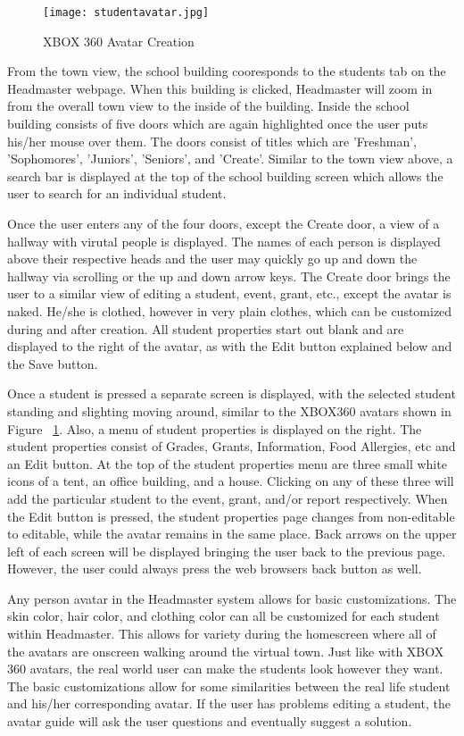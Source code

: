 \documentclass[11pt]{article}
\begin{document}
\begin{figure}
\centering
\texttt{[image: studentavatar.jpg]}
\caption{XBOX 360 Avatar Creation}
\label{avatar}
\end{figure}

From the town view, the school building cooresponds to the students tab on the Headmaster webpage. When this building is clicked, Headmaster will zoom in from the overall town view to the inside of the building. Inside the school building consists of five doors which are again highlighted once the user puts his/her mouse over them. The doors consist of titles which are 'Freshman', 'Sophomores', 'Juniors', 'Seniors', and 'Create'. Similar to the town view above, a search bar is displayed at the top of the school building screen which allows the user to search for an individual student.

Once the user enters any of the four doors, except the Create door, a view of a hallway with virutal people is displayed. The names of each person is displayed above their respective heads and the user may quickly go up and down the hallway via scrolling or the up and down arrow keys. The Create door brings the user to a similar view of editing a student, event, grant, etc., except the avatar is naked. He/she is clothed, however in very plain clothes, which can be customized during and after creation. All student properties start out blank and are displayed to the right of the avatar, as with the Edit button explained below and the Save button.

Once a student is pressed a separate screen is displayed, with the selected student standing and slighting moving around, similar to the XBOX360 avatars shown in Figure ~\ref{avatar}. Also, a menu of student properties is displayed on the right. The student properties consist of Grades, Grants, Information, Food Allergies, etc and an Edit button. At the top of the student properties menu are three small white icons of a tent, an office building, and a house. Clicking on any of these three will add the particular student to the event, grant, and/or report respectively. When the Edit button is pressed, the student properties page changes from non-editable to editable, while the avatar remains in the same place. Back arrows on the upper left of each screen will be displayed bringing the user back to the previous page. However, the user could always press the web browsers back button as well.

Any person avatar in the Headmaster system allows for basic customizations. The skin color, hair color, and clothing color can all be customized for each student within Headmaster. This allows for variety during the homescreen where all of the avatars are onscreen walking around the virtual town. Just like with XBOX 360 avatars, the real world user can make the students look however they want. The basic customizations allow for some similarities between the real life student and his/her corresponding avatar. If the user has problems editing a student, the avatar guide will ask the user questions  and eventually suggest a solution.
\end{document}
